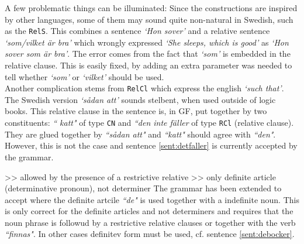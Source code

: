 \documentclass{report}
\begin{document}
A few problematic things can be illuminated:
Since the constructions are inspired by other languages, some of them may sound quite
non-natural in Swedish, such as the \verb|RelS|. This combines a sentence \emph{`Hon sover'}
and a relative sentence \emph{`som/vilket är bra'} which wrongly expressed 
\emph{`She sleeps, which is good'} as
\emph{`Hon sover som är bra'}. The error comes from the fact that \emph{`som'} is
embedded in the relative clause. This is easily fixed, by adding an extra
parameter was needed to tell whether \emph{`som'} or \emph{`vilket'} should be used. \\
Another complication stems from \verb|RelCl| which express the english \emph{`such that'}.
The Swedish version \emph{`sådan att'} sounds stelbent, when used outside of logic books.
This relative clause in the sentence is, in GF, put together by two constituents: \emph{`` katt"}
of type \verb-CN- and \emph{``den inte fäller} of type \verb-RCl- (relative clause). They are
glued together by \emph{``sådan att"} and \emph{``katt"} should agree with \emph{``den"}. 
 \label{sent:detfaller}
However, this is not the case and sentence \ref{sent:detfaller} is currently
accepted by the grammar.

>> allowed by the presence of a restrictive relative 
>> only definite article (determinative pronoun), not determiner
The grammar has been extended to accept
where the definite artcile \emph{``de"} is used together with a indefinite
noun. This is only correct for the definite articles and not determiners
and requires that the noun phrase is followud by a restrictive
relative clauses or together with the verb \emph{``finnas"}.
In other cases definitev form must be used, cf. sentence \ref{sent:debocker}.
\label{sent:debocker}

\end{document}
